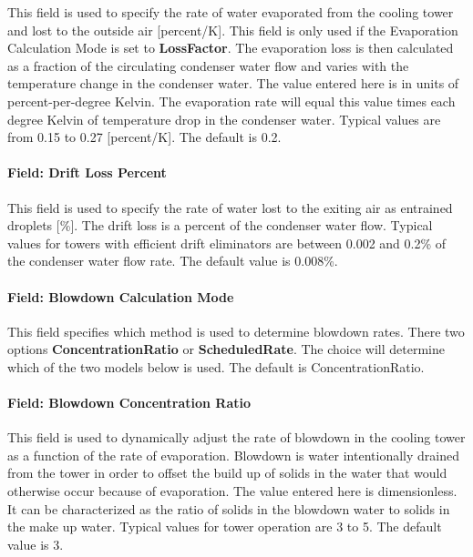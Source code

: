 This field is used to specify the rate of water evaporated from the cooling tower and lost to the outside air {[}percent/K{]}. This field is only used if the Evaporation Calculation Mode is set to \textbf{LossFactor}. The evaporation loss is then calculated as a fraction of the circulating condenser water flow and varies with the temperature change in the condenser water. The value entered here is in units of percent-per-degree Kelvin. The evaporation rate will equal this value times each degree Kelvin of temperature drop in the condenser water. Typical values are from 0.15 to 0.27 {[}percent/K{]}. The default is 0.2.

\paragraph{Field: Drift Loss Percent}\label{field-drift-loss-percent-2}

This field is used to specify the rate of water lost to the exiting air as entrained droplets {[}\%{]}. The drift loss is a percent of the condenser water flow. Typical values for towers with efficient drift eliminators are between 0.002 and 0.2\% of the condenser water flow rate. The default value is 0.008\%.

\paragraph{Field: Blowdown Calculation Mode}\label{field-blowdown-calculation-mode-2}

This field specifies which method is used to determine blowdown rates. There two options \textbf{ConcentrationRatio} or \textbf{ScheduledRate}. The choice will determine which of the two models below is used. The default is ConcentrationRatio.

\paragraph{Field: Blowdown Concentration Ratio}\label{field-blowdown-concentration-ratio-2}

This field is used to dynamically adjust the rate of blowdown in the cooling tower as a function of the rate of evaporation. Blowdown is water intentionally drained from the tower in order to offset the build up of solids in the water that would otherwise occur because of evaporation. The value entered here is dimensionless. It can be characterized as the ratio of solids in the blowdown water to solids in the make up water. Typical values for tower operation are 3 to 5. The default value is 3.


